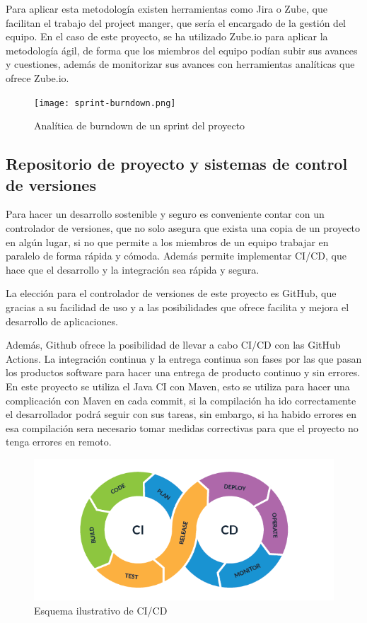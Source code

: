 Para aplicar esta metodología existen herramientas como Jira o Zube, que facilitan el trabajo del project manger, que sería el encargado de la gestión del equipo. En el caso de este proyecto, se ha utilizado Zube.io para aplicar la metodología ágil, de forma que los miembros del equipo podían subir sus avances y cuestiones, además de monitorizar sus avances con herramientas analíticas que ofrece Zube.io.

\begin{figure}[H]
    \centering
    \texttt{[image: sprint-burndown.png]}
    \caption{Analítica de burndown de un sprint del proyecto}
    \label{fig:enter-label}
\end{figure}

\subsection{Repositorio de proyecto y sistemas de control de versiones}
Para hacer un desarrollo sostenible y seguro es conveniente contar con un controlador de versiones, que no solo asegura que exista una copia de un proyecto en algún lugar, si no que permite a los miembros de un equipo trabajar en paralelo de forma rápida y cómoda. Además permite implementar CI/CD, que hace que el desarrollo y la integración sea rápida y segura.

La elección para el controlador de versiones de este proyecto es GitHub, que gracias a su facilidad de uso y a las posibilidades que ofrece facilita y mejora el desarrollo de aplicaciones.

Además, Github ofrece la posibilidad de llevar a cabo CI/CD \cite{ci-cd} con las GitHub Actions. La integración continua y la entrega continua son fases por las que pasan los productos software para hacer una entrega de producto continuo y sin errores. En este proyecto se utiliza el Java CI con Maven, esto se utiliza para hacer una complicación con Maven en cada commit, si la compilación ha ido correctamente el desarrollador podrá seguir con sus tareas, sin embargo, si ha habido errores en esa compilación sera necesario tomar medidas correctivas para que el proyecto no tenga errores en remoto.

\begin{figure}[H]
    \centering
    \includegraphics[width=1\linewidth]{img/ci-cd.png}
    \caption{Esquema ilustrativo de CI/CD}
    \label{fig:enter-label}
\end{figure}

